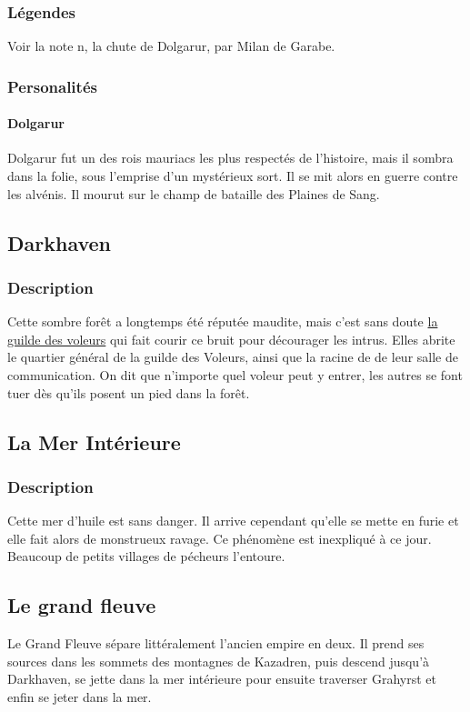 \subsubsection{Légendes}
Voir la note n, la chute de Dolgarur, par Milan de Garabe.
\subsubsection{Personalités}
\paragraph{Dolgarur}
\hypertarget {dolgarur}{}Dolgarur fut un des rois mauriacs les plus respectés de l'histoire, mais il sombra dans la folie, sous l'emprise d'un mystérieux sort. 
Il se mit alors en guerre contre les alvénis. 
Il mourut sur le champ de bataille des Plaines de Sang.
\subsection{Darkhaven}
\subsubsection{Description}
\hypertarget{darkhaven}{}Cette sombre forêt a longtemps été réputée maudite,
mais c'est sans doute \hyperlink{laguildedesvoleurs}{la guilde des voleurs} qui fait courir ce bruit pour décourager les intrus.
Elles abrite le quartier général de la guilde des Voleurs, ainsi que la racine de de leur salle de communication. 
On dit que n'importe quel voleur peut y entrer, les autres se font tuer dès qu'ils posent un pied dans la forêt.
\subsection{La Mer Intérieure}
\subsubsection{Description}
\hypertarget {lamerinterieure}{}Cette mer d'huile est sans danger.
Il arrive cependant qu’elle se mette en furie et elle fait alors de monstrueux ravage.
Ce phénomène est inexpliqué à ce jour.
Beaucoup de petits villages de pécheurs l'entoure.
\subsection{Le grand fleuve}
Le Grand Fleuve sépare littéralement l'ancien empire en deux. Il prend ses sources dans les sommets des montagnes de Kazadren, puis descend jusqu'à Darkhaven, se jette dans la mer intérieure pour ensuite traverser Grahyrst et enfin se jeter dans la mer.
